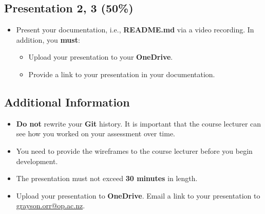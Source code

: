 \documentclass{article}
\begin{document}
\subsection*{Presentation 2, 3 (50\%)}
\begin{itemize}
	\item Present your documentation, i.e., \textbf{README.md} via a video recording. In addition, you \textbf{must}:
	      \begin{itemize}
		      \item Upload your presentation to your \textbf{OneDrive}.
		      \item Provide a link to your presentation in your documentation.
	      \end{itemize}
\end{itemize}

\subsection*{Additional Information}
\begin{itemize}
	\item \textbf{Do not} rewrite your \textbf{Git} history. It is important that the course lecturer can see how you worked on your assessment over time.
	\item You need to provide the wireframes to the course lecturer before you begin development.
	\item The presentation must not exceed \textbf{30 minutes} in length.
	\item Upload your presentation to \textbf{OneDrive}. Email a link to your presentation to \href{grayson.orr@op.ac.nz}{grayson.orr@op.ac.nz}.
\end{itemize}
\end{document}
